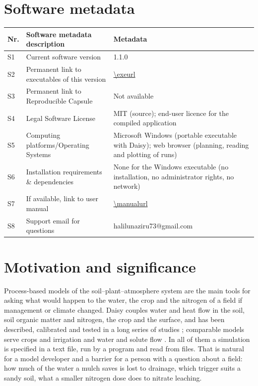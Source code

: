 \documentclass[preprint,12pt]{elsarticle}
\begin{document}
\section*{Software metadata}
\begin{table}[H]\centering\small
\begin{tabularx}{\textwidth}{lp{5.2cm}X}
\toprule
Nr. & Software metadata description & Metadata\\\midrule
S1 & Current software version & 1.1.0\\
S2 & Permanent link to executables of this version & \url{\exeurl}\\
S3 & Permanent link to Reproducible Capsule & Not available\\
S4 & Legal Software License & MIT (source); end-user licence for the compiled application\\
S5 & Computing platforms/Operating Systems & Microsoft Windows (portable executable with Daisy); web browser (planning, reading and plotting of runs)\\
S6 & Installation requirements \& dependencies & None for the Windows executable (no installation, no administrator rights, no network)\\
S7 & If available, link to user manual & \url{\manualurl}\\
S8 & Support email for questions & halilunaziru73@gmail.com\\\bottomrule
\end{tabularx}
\end{table}

\linenumbers
\section{Motivation and significance}
Process-based models of the soil--plant--atmosphere system are the main tools for asking what would happen to the water, the crop and the nitrogen of a field if management or climate changed. Daisy couples water and heat flow in the soil, soil organic matter and nitrogen, the crop and the surface, and has been described, calibrated and tested in a long series of studies \cite{Hansen1990,Abrahamsen2000,Hansen2012,Holbak2026}; comparable models serve crops and irrigation \cite{Jones2003,Keating2003,Steduto2009} and water and solute flow \cite{Simunek2008,Simunek2016}. In all of them a simulation is specified in a text file, run by a program and read from files. That is natural for a model developer and a barrier for a person with a question about a field: how much of the water a mulch saves is lost to drainage, which trigger suits a sandy soil, what a smaller nitrogen dose does to nitrate leaching.
\end{document}
